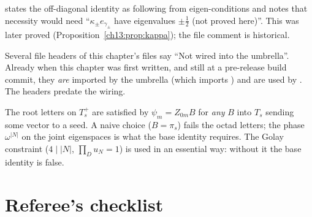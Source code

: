 \begin{warning}[title={Trap / dead end: The eigenvalue $\pm\tfrac12$ was once an unproved assumption}]
 states the off-diagonal identity as following from eigen-conditions and
notes that necessity would need ``$\kappa_\pm e_{\gamma_\pm}$ have eigenvalues $\pm\tfrac12$ (not proved here)''. This was
later proved (Proposition~\ref{ch13:prop:kappa}); the file comment is historical.
\end{warning}

\begin{warning}[title={Trap / dead end: Stale file headers}]
Several file headers of this chapter's files say ``Not wired into the umbrella''. Already when this chapter was
first written, and still at a pre-release build commit, they \emph{are} imported by the umbrella  (which imports
) and are used by . The headers predate the wiring.
\end{warning}

\begin{warning}[title={Trap / dead end: The choice of $B$ on $T_s^+$ is forced by the octads}]
The root letters on $T_s^+$ are satisfied by $\psi_m=Z_{0m}B$ for \emph{any} $B$ into $T_s$ sending some vector to a
seed. A naive choice ($B=\pi_s$) fails the octad letters; the phase $\omega^{|N|}$ on the joint eigenspaces is
what the base identity requires. The Golay constraint ($4\mid|N|$, $\prod_Du_N=1$) is used in an essential way:
without it the base identity is false.
\end{warning}

\section{Referee's checklist}\label{ch13:sec:referee}

